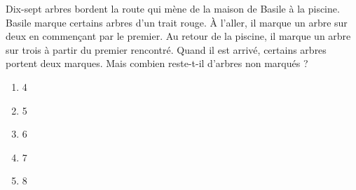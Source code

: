 Dix-sept arbres bordent la route qui mène de la maison de Basile à la piscine. Basile marque
certains arbres d'un trait rouge. À l'aller, il marque un arbre sur deux en commençant par le premier. Au retour de la piscine, il marque un arbre sur trois à partir du premier rencontré. Quand il est arrivé, certains arbres portent deux marques. Mais combien reste-t-il d'arbres non marqués ?
\begin{multicols}{5}
  \begin{enumerate}[A/]
  \item 4
  \item 5
  \item 6
  \item 7
  \item 8
  \end{enumerate}
\end{multicols}